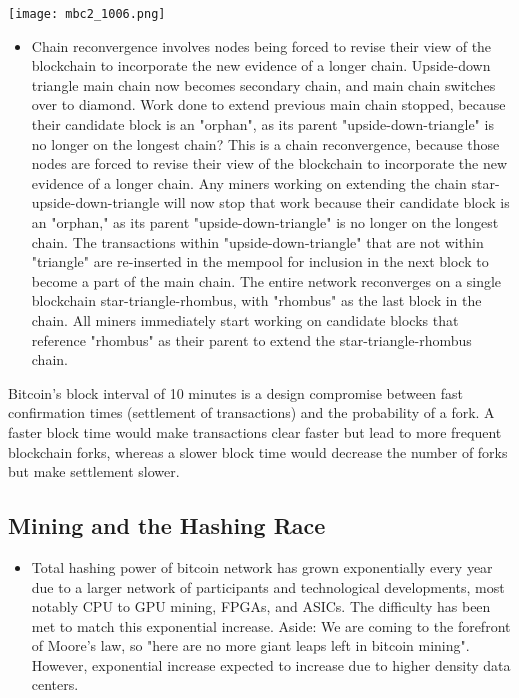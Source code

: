 \documentclass[english, 11pt]{article}
\begin{document}
\begin{tcolorbox}
\begin{minipage}{0.45\linewidth}
    \texttt{[image: mbc2\_1006.png]}
    \label{fig:fig1}  
\end{minipage}\hfil
\begin{minipage}{0.45\linewidth}
\begin{itemize}
    \item Chain reconvergence involves nodes being forced to revise their view of the blockchain to incorporate the new evidence of a longer chain. Upside-down triangle main chain now becomes secondary chain, and main chain switches over to diamond. Work done to extend previous main chain stopped, because their candidate block is an "orphan", as its parent "upside-down-triangle" is no longer on the longest chain? 
    This is a chain reconvergence, because those nodes are forced to revise their view of the blockchain to incorporate the new evidence of a longer chain. Any miners working on extending the chain star-upside-down-triangle will now stop that work because their candidate block is an "orphan," as its parent "upside-down-triangle" is no longer on the longest chain. The transactions within "upside-down-triangle" that are not within "triangle" are re-inserted in the mempool for inclusion in the next block to become a part of the main chain. The entire network reconverges on a single blockchain star-triangle-rhombus, with "rhombus" as the last block in the chain. All miners immediately start working on candidate blocks that reference "rhombus" as their parent to extend the star-triangle-rhombus chain.
\end{itemize}
\end{minipage}
\end{tcolorbox}

\noindent Bitcoin’s block interval of 10 minutes is a design compromise between fast confirmation times (settlement of transactions) and the probability of a fork. A faster block time would make transactions clear faster but lead to more frequent blockchain forks, whereas a slower block time would decrease the number of forks but make settlement slower.

\subsection{Mining and the Hashing Race}
\begin{itemize}
    \item Total hashing power of bitcoin network has grown exponentially every year due to a larger network of participants and technological developments, most notably CPU to GPU mining, FPGAs, and ASICs. The difficulty has been met to match this exponential increase. Aside: We are coming to the forefront of Moore's law, so "here are no more giant leaps left in bitcoin mining". However, exponential increase expected to increase due to higher density data centers.
\end{itemize}
\end{document}
